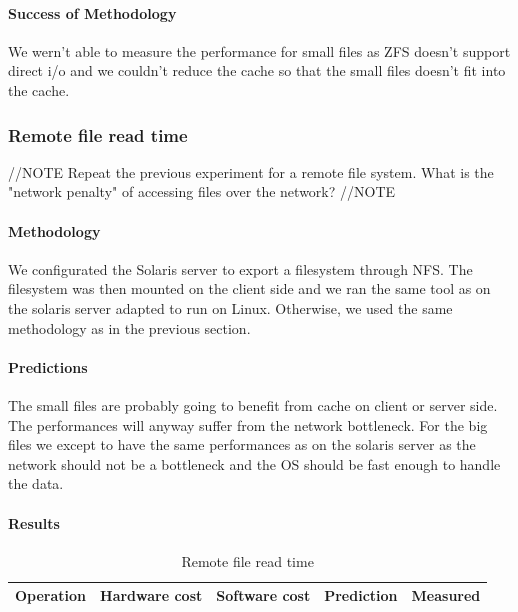 \paragraph{Success of Methodology}
We wern't able to measure the performance for small files as ZFS doesn't support
direct i/o and we couldn't reduce the cache so that the small files doesn't fit
into the cache.





\subsubsection{Remote file read time}
//NOTE
Repeat the previous experiment for a remote file system. What is the "network penalty" of accessing files over the network?
//NOTE

\paragraph{Methodology}
We configurated the Solaris server to export a filesystem through NFS.
The filesystem was then mounted on the client side and we ran the same tool as
on the solaris server adapted to run on Linux.
Otherwise, we used the same methodology as in the previous section.

\paragraph{Predictions}
The small files are probably going to benefit from cache on client or server
side.
The performances will anyway suffer from the network bottleneck.
For the big files we except to have the same performances as on the solaris
server as the network should not be a bottleneck and the OS should be fast
enough to handle the data.

\paragraph{Results}

\begin{table}[h]
\begin{center}
\begin{tabular}{| l | l | l | l | l |}
\hline
Operation & Hardware cost & Software cost & Prediction & Measured \\
\hline
\end{tabular}
\end{center}
\caption{Remote file read time\label{tab:remote-file-access}}
\end{table}

